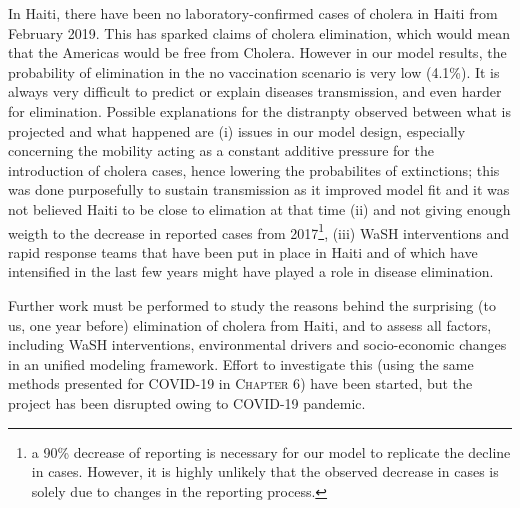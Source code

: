  In Haiti, there have been no laboratory-confirmed cases of cholera in Haiti from February 2019. This has sparked claims of cholera elimination, which would mean that the Americas would be free from Cholera. However in our model results, the probability of elimination in the no vaccination scenario is very low (4.1\%). It is always very difficult to predict or explain diseases transmission, and even harder for elimination. Possible explanations for the distranpty observed between what is projected and what happened are (i) issues in our model design, especially concerning the mobility acting as a constant additive pressure for the introduction of cholera cases, hence lowering the probabilites of extinctions; this was done purposefully to sustain transmission as it improved model fit and it was not believed Haiti to be close to elimation at that time (ii) and not giving enough weigth to the decrease in reported cases from 2017\footnote[][-1.5\baselineskip]{a 90\% decrease of reporting is necessary for our model to replicate the decline in cases. However, it is highly unlikely that the observed decrease in cases is solely due to changes in the reporting process.}, (iii) WaSH interventions and rapid response teams that have been put in place in Haiti and of which have intensified in the last few years\cite{Rebaudet:CaseareaTargetedRapid:2019} might have played a role in disease elimination.
  
 Further work must be performed to study the reasons behind the surprising (to us, one year before) elimination of cholera from Haiti, and to assess all factors, including WaSH interventions, environmental drivers and socio-economic changes in an unified modeling framework. Effort to investigate this (using the same methods presented for COVID-19 in \textsc{Chapter 6}) have been started, but the project has been disrupted owing to COVID-19 pandemic.
 
